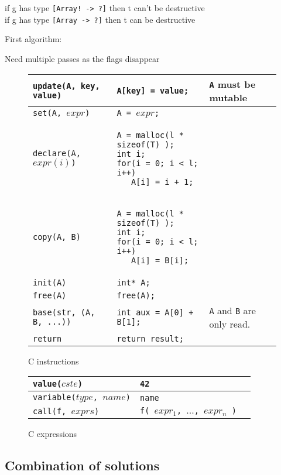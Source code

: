 \documentclass[12pt,a4paper]{article}
\newcommand{\cl}[1]{\texttt{#1}}
\newcommand{\mut}{  \textbf{ mutable } }
\begin{document}
if g has type \cl{[Array! -> ?]} then t can't be destructive\\

if g has type \cl{[Array -> ?]} then t can be destructive

First algorithm:


Need multiple passes as the flags disappear


\begin{figure}[!ht]
\begin{tabular}{|p{50mm}|p{62mm}|p{45mm}|}
\hline
\cl{update(A, key, value)} & \cl{A[key] = value;} & \cl{A} must be \mut \\ \hline
\cl{set(A, $expr$)} & \cl{A = $expr$;} \\ \hline
\cl{declare(A, $expr(i)$)} & \begin{lstlisting}
A = malloc(l * sizeof(T) );
int i;
for(i = 0; i < l; i++)
   A[i] = i + 1;
\end{lstlisting} & \\ \hline
\cl{copy(A, B)} & \begin{lstlisting}
A = malloc(l * sizeof(T) );
int i;
for(i = 0; i < l; i++)
   A[i] = B[i];
\end{lstlisting} & \\ \hline
\cl{init(A)} & \cl{int* A;} & \\ \hline
\cl{free(A)} & \cl{free(A);} & \\ \hline
\cl{base(str, (A, B, ...))} & \cl{int aux = A[0] + B[1];} & \cl{A} and \cl{B} are only read. \\ \hline
\cl{return} & \cl{return result;} & \\ \hline
\end{tabular}
\caption{C instructions}
\end{figure}



\begin{figure}[!ht]
\begin{tabular}{|p{50mm}|p{50mm}|p{50mm}|}
\hline
\cl{value($cste$)} & \cl{42} & \\ \hline
\cl{variable($type$, $name$)} & \cl{name} & \\ \hline
\cl{call(f, $exprs$)} & \cl{f( $expr_1$, $...$, $expr_n$ )} & \\ \hline
\end{tabular}
\caption{C expressions}
\end{figure}




\subsection{Combination of solutions}
\end{document}
